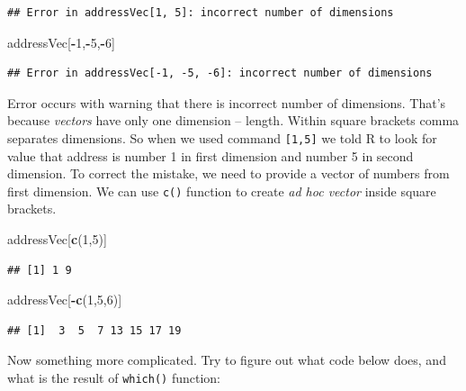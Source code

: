 \documentclass[]{book}
\newenvironment{Shaded}{\begin{snugshade}}{\end{snugshade}}
\newcommand{\KeywordTok}[1]{\textcolor[rgb]{0.13,0.29,0.53}{\textbf{#1}}}
\newcommand{\DecValTok}[1]{\textcolor[rgb]{0.00,0.00,0.81}{#1}}
\newcommand{\OperatorTok}[1]{\textcolor[rgb]{0.81,0.36,0.00}{\textbf{#1}}}
\newcommand{\NormalTok}[1]{#1}
\theoremstyle{definition}
\theoremstyle{definition}
\theoremstyle{definition}
\theoremstyle{remark}
\begin{document}
\begin{verbatim}
## Error in addressVec[1, 5]: incorrect number of dimensions
\end{verbatim}

\begin{Shaded}
\begin{Highlighting}[]
\NormalTok{addressVec[}\OperatorTok{-}\DecValTok{1}\NormalTok{,}\OperatorTok{-}\DecValTok{5}\NormalTok{,}\OperatorTok{-}\DecValTok{6}\NormalTok{]}
\end{Highlighting}
\end{Shaded}

\begin{verbatim}
## Error in addressVec[-1, -5, -6]: incorrect number of dimensions
\end{verbatim}

Error occurs with warning that there is incorrect number of dimensions.
That's because \emph{vectors} have only one dimension -- length. Within
square brackets comma separates dimensions. So when we used command
\texttt{{[}1,5{]}} we told R to look for value that address is number 1
in first dimension and number 5 in second dimension. To correct the
mistake, we need to provide a vector of numbers from first dimension. We
can use \texttt{c()} function to create \emph{ad hoc vector} inside
square brackets.

\begin{Shaded}
\begin{Highlighting}[]
\NormalTok{addressVec[}\KeywordTok{c}\NormalTok{(}\DecValTok{1}\NormalTok{,}\DecValTok{5}\NormalTok{)]}
\end{Highlighting}
\end{Shaded}

\begin{verbatim}
## [1] 1 9
\end{verbatim}

\begin{Shaded}
\begin{Highlighting}[]
\NormalTok{addressVec[}\OperatorTok{-}\KeywordTok{c}\NormalTok{(}\DecValTok{1}\NormalTok{,}\DecValTok{5}\NormalTok{,}\DecValTok{6}\NormalTok{)]}
\end{Highlighting}
\end{Shaded}

\begin{verbatim}
## [1]  3  5  7 13 15 17 19
\end{verbatim}

Now something more complicated. Try to figure out what code below does,
and what is the result of \texttt{which()} function:
\end{document}
